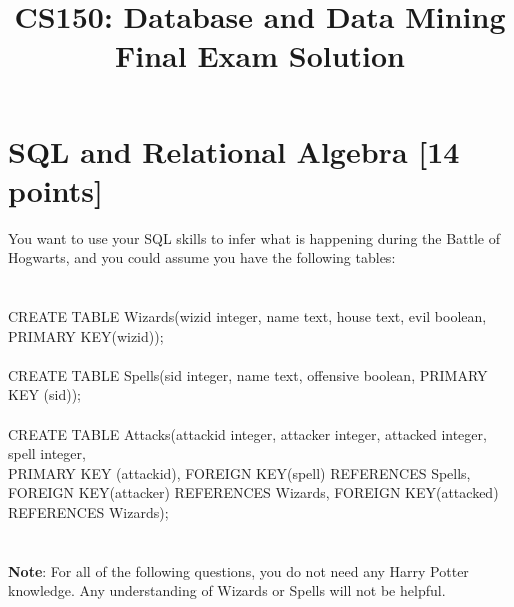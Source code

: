 \documentclass[10pt]{article}
\begin{document}
\title{CS150: Database and Data Mining \\%
	Final Exam Solution}
\maketitle


\section{ \textbf{ SQL and Relational Algebra [14 points]}}

You want to use your SQL skills to infer what is happening during the Battle of Hogwarts, and you could assume you have the following tables:
\\
\\
\\
CREATE TABLE Wizards(wizid integer, name text, house text, evil boolean, PRIMARY KEY(wizid));
\\
\\
CREATE TABLE Spells(sid integer, name text, offensive boolean, PRIMARY KEY (sid));
\\
\\
CREATE TABLE Attacks(attackid integer, attacker integer, attacked integer, spell integer,\\
PRIMARY KEY (attackid), FOREIGN KEY(spell) REFERENCES Spells,\\
FOREIGN KEY(attacker) REFERENCES Wizards, FOREIGN KEY(attacked) REFERENCES Wizards);
\\
\\
\\
\textbf{Note}: For all of the following questions, you do not need any Harry Potter knowledge. Any understanding of Wizards or Spells will not be helpful.
\end{document}
